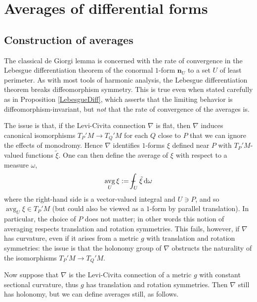\documentclass[reqno,11pt]{amsart}
\DeclareMathOperator{\avg}{avg}
\newcommand*\dif{\mathop{}\!\mathrm{d}}
\newcommand{\normal}{\mathbf n}
\theoremstyle{definition}
\numberwithin{equation}{section}
\def\Xint#1{\mathchoice
{\XXint\displaystyle\textstyle{#1}}%
{\XXint\textstyle\scriptstyle{#1}}%
{\XXint\scriptstyle\scriptscriptstyle{#1}}%
{\XXint\scriptscriptstyle\scriptscriptstyle{#1}}%
\!\int}
\def\XXint#1#2#3{{\setbox0=\hbox{$#1{#2#3}{\int}$ }
\vcenter{\hbox{$#2#3$ }}\kern-.6\wd0}}
\def\dashint{\Xint-}
\begin{document}
\section{Averages of differential forms}\label{excess section}
\subsection{Construction of averages}
The classical de Giorgi lemma is concerned with the rate of convergence in the Lebesgue differentiation theorem of the conormal $1$-form $\normal_U$ to a set $U$ of least perimeter.
As with most tools of harmonic analysis, the Lebesgue differentiation theorem breaks diffeomorphism symmetry.
This is true even when stated carefully as in Proposition \ref{LebesgueDiff}, which asserts that the limiting behavior is diffeomorphism-invariant, but \emph{not} that the rate of convergence of the averages is.

The issue is that, if the Levi-Civita connection $\nabla$ is flat, then $\nabla$ induces canonical isomorphisms $T_P'M \to T_Q'M$ for each $Q$ close to $P$ that we can ignore the effects of monodromy.
Hence $\nabla$ identifies $1$-forms $\xi$ defined near $P$ with $T_P'M$-valued functions $\tilde \xi$.
One can then define the average of $\xi$ with respect to a measure $\omega$,
\begin{equation}\label{averages and flat connections}
\avg_U \xi := \dashint_U \tilde \xi \dif \omega
\end{equation}
where the right-hand side is a vector-valued integral and $U \ni P$, and so $\avg_U \xi \in T_P'M$ (but could also be viewed as a $1$-form by parallel translation).
In particular, the choice of $P$ does not matter; in other words this notion of averaging respects translation and rotation symmetries.
This fails, however, if $\nabla$ has curvature, even if it arises from a metric $g$ with translation and rotation symmetries: the issue is that the holonomy group of $\nabla$ obstructs the naturality of the isomorphisms $T_P'M \to T_Q'M$.

Now suppose that $\nabla$ is the Levi-Civita connection of a metric $g$ with constant sectional curvature, thus $g$ has translation and rotation symmetries.
Then $\nabla$ still has holonomy, but we can define averages still, as follows.
\end{document}
